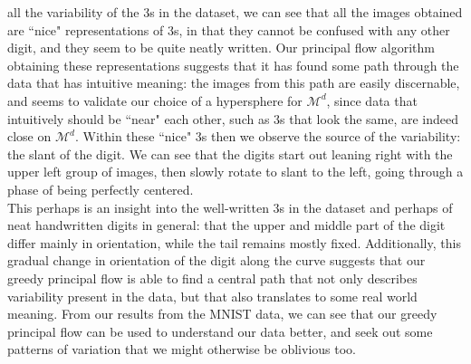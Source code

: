 \documentclass[12pt]{report}
\begin{document}
all the variability of the 3s in the dataset, we can see that 
all the images obtained are ``nice" representations of 3s,
in that they cannot be confused with any other digit, 
and they seem to be quite neatly written.
Our principal flow algorithm obtaining these 
representations suggests that it has found some 
path through the data that has intuitive meaning: the images from this 
path are easily discernable, and seems to validate our choice of 
a hypersphere for $\mathcal{M}^d$, since data that intuitively
should be ``near" each other, such as 3s that look the same, are indeed 
close on $\mathcal{M}^d$.
Within these ``nice" 3s then we observe the source of the variability:
the slant of the digit. We can see that the digits start out 
leaning right with the upper left group of images, then slowly rotate
to slant to the left, going through a phase of being perfectly centered.
\\
This perhaps is an insight into the well-written 3s in the dataset and perhaps 
of neat handwritten digits in general: that the upper and middle part of the
digit differ mainly in orientation, while the tail remains mostly fixed.
Additionally, this gradual change in
orientation of the digit along the curve suggests that our 
greedy principal flow is able to find a central path that not only 
describes variability present in the data, but that also translates to some 
real world meaning. 
From our results from the MNIST data, 
we can see that our greedy principal flow can be used to understand
our data better, and seek out some patterns of variation
that we might otherwise be oblivious too.

\newpage
\end{document}
